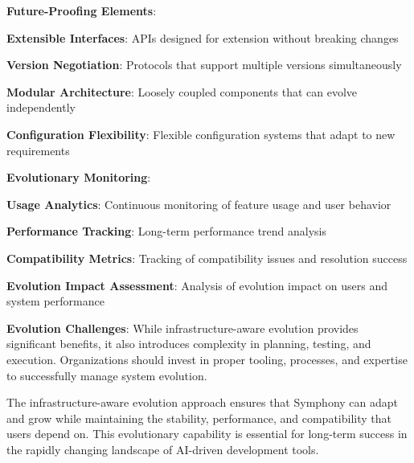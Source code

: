 \textbf{Future-Proofing Elements}:
\begin{compactlist}
    \item \textbf{Extensible Interfaces}: APIs designed for extension without breaking changes
    \item \textbf{Version Negotiation}: Protocols that support multiple versions simultaneously
    \item \textbf{Modular Architecture}: Loosely coupled components that can evolve independently
    \item \textbf{Configuration Flexibility}: Flexible configuration systems that adapt to new requirements
\end{compactlist}

\textbf{Evolutionary Monitoring}:
\begin{compactlist}
    \item \textbf{Usage Analytics}: Continuous monitoring of feature usage and user behavior
    \item \textbf{Performance Tracking}: Long-term performance trend analysis
    \item \textbf{Compatibility Metrics}: Tracking of compatibility issues and resolution success
    \item \textbf{Evolution Impact Assessment}: Analysis of evolution impact on users and system performance
\end{compactlist}

\begin{alertbox}
\textbf{Evolution Challenges}: While infrastructure-aware evolution provides significant benefits, it also introduces complexity in planning, testing, and execution. Organizations should invest in proper tooling, processes, and expertise to successfully manage system evolution.
\end{alertbox}

The infrastructure-aware evolution approach ensures that Symphony can adapt and grow while maintaining the stability, performance, and compatibility that users depend on. This evolutionary capability is essential for long-term success in the rapidly changing landscape of AI-driven development tools.